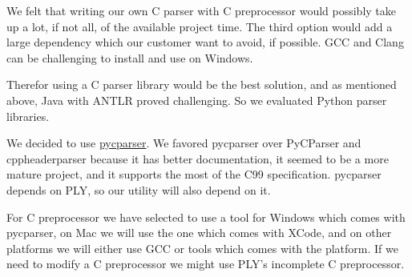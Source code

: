 We felt that writing our own C parser with C preprocessor would possibly take
up a lot, if not all, of the available project time. The third option would add
a large dependency which our customer want to avoid, if possible. GCC and Clang
can be challenging to install and use on Windows.

Therefor using a C parser library would be the best solution, and as mentioned
above, Java with ANTLR proved challenging. So we evaluated Python parser
libraries.

We decided to use \hyperref[sec:pre:pycparser]{pycparser}. We favored pycparser
over PyCParser and cppheaderparser because it has better documentation, it
seemed to be a more mature project, and it supports the most of the C99
specification. pycparser depends on PLY, so our utility will also depend on it.

For C preprocessor we have selected to use a tool for Windows which comes with
pycparser, on Mac we will use the one which comes with XCode, and on other
platforms we will either use GCC or tools which comes with the platform. If we
need to modify a C preprocessor we might use PLY's incomplete C preprocessor.

